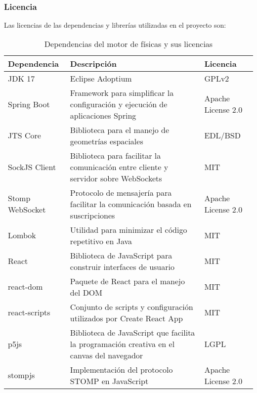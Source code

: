 \subsubsection{Licencia}
Las licencias de las dependencias y librerías utilizadas en el proyecto son:

\begin{table}[h]
\centering
\begin{tabularx}{\textwidth}{| l | >{\raggedright\arraybackslash}X | l |}
\hline
\textbf{Dependencia} & \textbf{Descripción} & \textbf{Licencia} \\ \hline
    JDK 17\cite{jdk17_adoptium_license} & Eclipse Adoptium & GPLv2 \\ \hline
    Spring Boot\cite{springboot_license} & Framework para simplificar la configuración y ejecución de aplicaciones Spring & Apache License 2.0 \\ \hline
    JTS Core\cite{jtscore_license} & Biblioteca para el manejo de geometrías espaciales & EDL/BSD \\ \hline
    SockJS Client\cite{sockjsclient_license} & Biblioteca para facilitar la comunicación entre cliente y servidor sobre WebSockets & MIT \\ \hline
    Stomp WebSocket\cite{stompwebsocket_license} & Protocolo de mensajería para facilitar la comunicación basada en suscripciones & Apache License 2.0 \\ \hline
    Lombok\cite{lombok_license} & Utilidad para minimizar el código repetitivo en Java & MIT \\ \hline
    React\cite{react_license} & Biblioteca de JavaScript para construir interfaces de usuario & MIT \\ \hline
    react-dom\cite{reactdom_license} & Paquete de React para el manejo del DOM & MIT \\ \hline
    react-scripts \cite{reactscripts_license}& Conjunto de scripts y configuración utilizados por Create React App & MIT \\ \hline
    p5js\cite{p5js_license} & Biblioteca de JavaScript que facilita la programación creativa en el canvas del navegador & LGPL \\ \hline
    stompjs\cite{stompjs_license} & Implementación del protocolo STOMP en JavaScript & Apache License 2.0 \\ \hline
\end{tabularx}
\caption{Dependencias del motor de físicas y sus licencias}
\label{tab:licencias}
\end{table}

